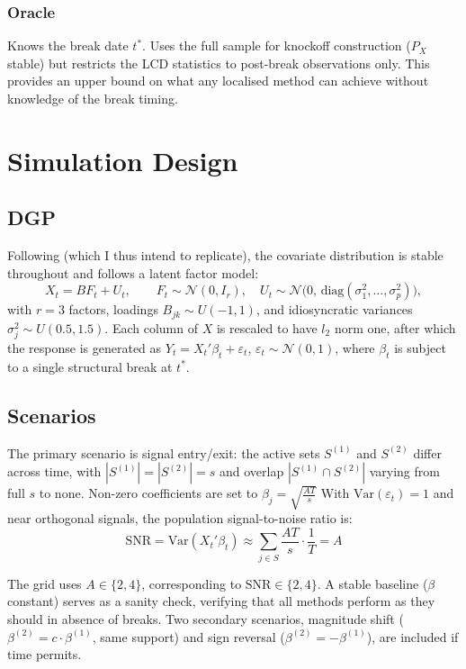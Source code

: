 \documentclass[12pt, a4paper]{article}
\begin{document}
\subsubsection{Oracle}
 
Knows the break date $t^*$. Uses the full sample for knockoff construction ($P_X$ stable) but restricts the LCD statistics to post-break observations only. This provides an upper bound on what any localised method can achieve without knowledge of the break timing.

\section{Simulation Design}
\subsection{DGP}
Following \citet{fan2020ipad} (which I thus intend to replicate), the covariate distribution is stable throughout and follows a latent factor model:
\begin{equation}
    X_t = BF_t + U_t, \qquad F_t \sim \mathcal{N}(0, I_r), \quad U_t \sim \mathcal{N}\!\bigl(0,\, \text{diag}(\sigma_1^2, \ldots, \sigma_p^2)\bigr),
\end{equation}
with $r = 3$ factors, loadings $B_{jk} \sim U(-1,1)$, and idiosyncratic variances $\sigma_j^2 \sim U(0.5, 1.5)$. Each column of $X$ is rescaled to have $\textit{l}_2$ norm one, after which the response is generated as $Y_t = X_t'\beta_t + \varepsilon_t$, $\varepsilon_t \sim \mathcal{N}(0,1)$, where $\beta_t$ is subject to a single structural break at $t^*$.

\subsection{Scenarios}
 
The primary scenario is signal entry/exit: the active sets $S^{(1)}$ and $S^{(2)}$ differ across time, with $|S^{(1)}| = |S^{(2)}| = s$ and overlap $|S^{(1)} \cap S^{(2)}|$ varying from full $s$ to none. Non-zero coefficients are set to $\beta_j = \sqrt{\frac{AT}{s}}$  With $\text{Var}(\varepsilon_t) = 1$ and near orthogonal signals, the population signal-to-noise ratio is:
 $$\text{SNR} = \text{Var}(X_t'\beta_t) \approx \sum_{j \in S} \frac{AT}{s} \cdot \frac{1}{T} = A$$

The grid uses $A \in \{2, 4\}$, corresponding to $\text{SNR} \in \{2, 4\}$. A stable baseline ($\beta$ constant) serves as a sanity check, verifying that all methods perform as they should in absence of breaks. Two secondary scenarios, magnitude shift ($\beta^{(2)} = c \cdot \beta^{(1)}$, same support) and sign reversal ($\beta^{(2)} = -\beta^{(1)}$), are included if time permits.
\end{document}
